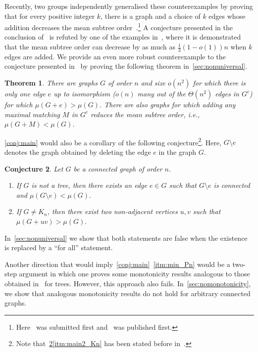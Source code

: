 \documentclass[11pt]{article}
\newtheorem{thr}{Theorem}[section]
\newtheorem{conj}[thr]{Conjecture}
\theoremstyle{definition}
\begin{document}
Recently, two groups independently generalised these counterexamples by proving that for every positive integer $k$, there is a graph and a choice of $k$ edges whose addition decreases the mean subtree order~\cite{CCHT23,CWL23}.\footnote{Here~\cite{CCHT23} was submitted first and~\cite{CWL23} was published first.}
A conjecture presented in the conclusion of~\cite{CWL23} is refuted by one of the examples in~\cite{CCHT23}, where it is demonstrated that the mean subtree order can decrease by as much as $\frac{1}{3}(1-o(1))n$ when $k$ edges are added. We provide an even more robust counterexample to the conjecture presented in~\cite[Conj.~7.4]{CGMV18} by proving the following theorem in~\cref{sec:nonuniversal}. 

\begin{thr}\label{thr:strong_counterexamples_toConj7.4Chin}
 There are graphs $G$ of order $n$ and size $o(n^2)$ for which there is only one edge $e$ up to isomorphism ($o(n)$ many out of the $\Theta(n^2)$ edges in $G^c$) for which $\mu(G+e)>\mu(G)$. 
 There are also graphs for which adding any maximal matching $M$ in $G^c$ reduces the mean subtree order, i.e., $\mu(G+M)<\mu(G)$.
\end{thr}

\cref{conj:main} would also be a corollary of the following conjecture\footnote{Note that~\cref{conj:main2}\ref{itm:main2_Kn} has been stated before in~\cite[Conj.~1.2]{CM21}.}. Here, $G \setminus e$ denotes the graph obtained by deleting the edge $e$ in the graph $G$.

\begin{conj}\label{conj:main2}
 Let $G$ be a connected graph of order $n$. 
 \begin{enumerate}
 \item\label{itm:main2_Pn} If $G$ is not a tree, then there exists an edge $e \in G$ such that $G \setminus e$ is connected and $\mu(G \setminus e)<\mu(G).$
 \item\label{itm:main2_Kn} If $G \neq K_n$, then there exist two non-adjacent vertices $u,v$ such that $\mu(G+uv)>\mu(G).$
 \end{enumerate}
\end{conj}

In~\cref{sec:nonuniversal} we show that both statements are false when the existence is replaced by a ``for all'' statement.

Another direction that would imply~\cref{conj:main}~\ref{itm:min_Pn} would be a two-step argument in which one proves some monotonicity results analogous to those obtained in~\cite{jamison_monotonicity_1984} for trees. 
However, this approach also fails.
In~\cref{sec:nomonotonicity}, we show that analogous monotonicity results do not hold for arbitrary connected graphs.
\end{document}
